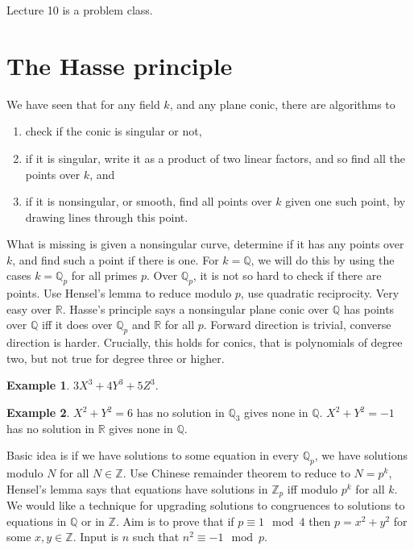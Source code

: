 \documentclass{article}
\newcommand{\Z}{\mathbb{Z}}
\newcommand{\Q}{\mathbb{Q}}
\newcommand{\R}{\mathbb{R}}
\theoremstyle{definition}\newtheorem{definition}{Definition}[section]
\theoremstyle{definition}\newtheorem{remark}[definition]{Remark}
\theoremstyle{definition}\newtheorem*{example}{Example}
\theoremstyle{definition}\newtheorem*{note}{Note}
\begin{document}
Lecture 10 is a problem class.


\section{The Hasse principle}

We have seen that for any field $ k $, and any plane conic, there are algorithms to
\begin{enumerate}
\item check if the conic is singular or not,
\item if it is singular, write it as a product of two linear factors, and so find all the points over $ k $, and
\item if it is nonsingular, or smooth, find all points over $ k $ given one such point, by drawing lines through this point.
\end{enumerate}
What is missing is given a nonsingular curve, determine if it has any points over $ k $, and find such a point if there is one. For $ k = \Q $, we will do this by using the cases $ k = \Q_p $ for all primes $ p $. Over $ \Q_p $, it is not so hard to check if there are points. Use Hensel's lemma to reduce modulo $ p $, use quadratic reciprocity. Very easy over $ \R $. Hasse's principle says a nonsingular plane conic over $ \Q $ has points over $ \Q $ iff it does over $ \Q_p $ and $ \R $ for all $ p $. Forward direction is trivial, converse direction is harder. Crucially, this holds for conics, that is polynomials of degree two, but not true for degree three or higher.

\begin{example}
$ 3X^3 + 4Y^3 + 5Z^3 $.
\end{example}

\begin{example}
$ X^2 + Y^2 = 6 $ has no solution in $ \Q_3 $ gives none in $ \Q $. $ X^2 + Y^2 = -1 $ has no solution in $ \R $ gives none in $ \Q $.
\end{example}

Basic idea is if we have solutions to some equation in every $ \Q_p $, we have solutions modulo $ N $ for all $ N \in \Z $. Use Chinese remainder theorem to reduce to $ N = p^k $, Hensel's lemma says that equations have solutions in $ \Z_p $ iff modulo $ p^k $ for all $ k $. We would like a technique for upgrading solutions to congruences to solutions to equations in $ \Q $ or in $ \Z $. Aim is to prove that if $ p \equiv 1 \mod 4 $ then $ p = x^2 + y^2 $ for some $ x, y \in \Z $. Input is $ n $ such that $ n^2 \equiv -1 \mod p $.
\end{document}
